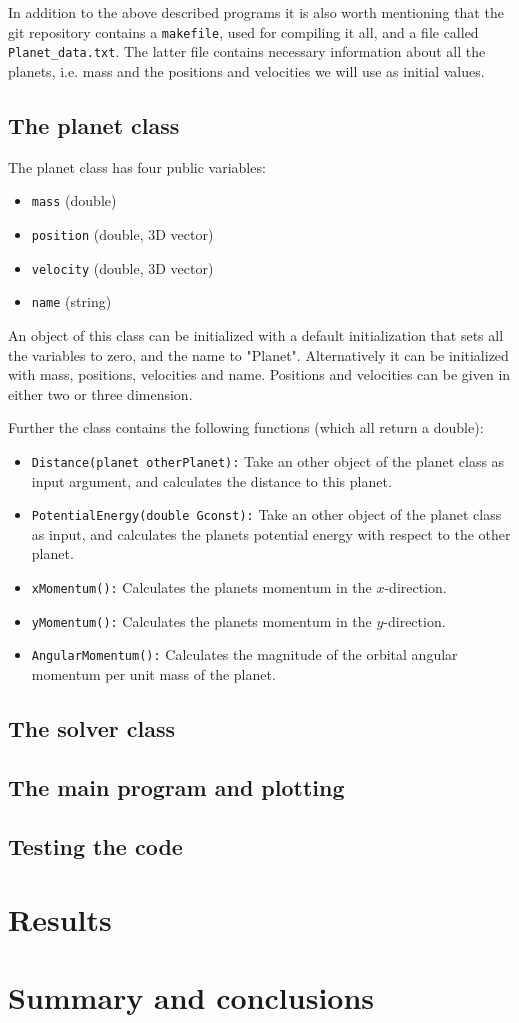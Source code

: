 \documentclass[12pt, a4paper]{article}
\begin{document}
In addition to the above described programs it is also worth mentioning that the git repository contains 
a \texttt{makefile}, used for compiling it all, and a file called \texttt{Planet\_data.txt}. The latter 
file contains necessary information about all the planets, i.e. mass and the positions and velocities 
we will use as initial values. 

\subsection{The planet class}

The planet class has four public variables: 
\begin{itemize}
\item \texttt{mass} (double)  
\item \texttt{position} (double, 3D vector)
\item \texttt{velocity} (double, 3D vector) 
\item \texttt{name} (string) 
\end{itemize}
An object of this class can be initialized with a default initialization that sets all the variables to 
zero, and the name to "Planet". Alternatively it can be initialized with mass, positions, velocities and 
name. Positions and velocities can be given in either two or three dimension. 

Further the class contains the following functions (which all return a double): 
\begin{itemize}
\item \texttt{Distance(planet otherPlanet):} Take an other object of the planet class as input argument, 
and calculates the distance to this planet. 
\item \texttt{PotentialEnergy(double Gconst):} Take an other object of the planet class as input, and 
calculates the planets potential energy with respect to the other planet.   
\item \texttt{xMomentum():} Calculates the planets momentum in the $x$-direction. 
\item \texttt{yMomentum():} Calculates the planets momentum in the $y$-direction. 
\item \texttt{AngularMomentum():} Calculates the magnitude of the orbital angular momentum per unit 
mass of the planet. 
\end{itemize}

\subsection{The solver class}

\subsection{The main program and plotting}

\subsection{Testing the code}

\section{Results}

\section{Summary and conclusions}
\end{document}
